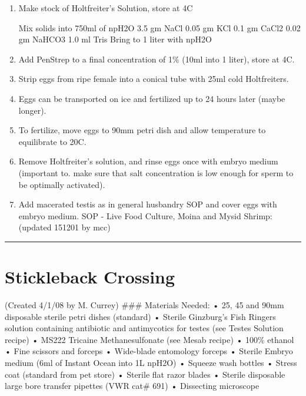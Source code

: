 \documentclass[
]{book}
\begin{document}
\begin{enumerate}
\def\labelenumi{\arabic{enumi}.}
\item
  Make stock of Holtfreiter's Solution, store at 4C

  Mix solids into 750ml of npH2O
  3.5 gm NaCl
  0.05 gm KCl
  0.1 gm CaCl2
  0.02 gm NaHCO3
  1.0 ml Tris
  Bring to 1 liter with npH2O
\item
  Add PenStrep to a final concentration of 1\% (10ml into 1 liter), store at 4C.
\item
  Strip eggs from ripe female into a conical tube with 25ml cold Holtfreiters.
\item
  Eggs can be transported on ice and fertilized up to 24 hours later (maybe longer).
\item
  To fertilize, move eggs to 90mm petri dish and allow temperature to equilibrate to 20C.
\item
  Remove Holtfreiter's solution, and rinse eggs once with embryo medium (important to.
  make sure that salt concentration is low enough for sperm to be optimally activated).
\item
  Add macerated testis as in general husbandry SOP and cover eggs with embryo medium.
  SOP - Live Food Culture, Moina and Mysid Shrimp:
  (updated 151201 by mcc)
\end{enumerate}

\begin{center}\rule{0.5\linewidth}{0.5pt}\end{center}

\hypertarget{stickleback-crossing}{%
\section{Stickleback Crossing}\label{stickleback-crossing}}

(Created 4/1/08 by M. Currey)
\#\#\# Materials Needed:
• 25, 45 and 90mm disposable sterile petri dishes (standard)
• Sterile Ginzburg's Fish Ringers solution containing antibiotic and antimycotics for testes (see Testes Solution recipe)
• MS222 Tricaine Methanesulfonate (see Mesab recipe)
• 100\% ethanol
• Fine scissors and forceps
• Wide-blade entomology forceps
• Sterile Embryo medium (6ml of Instant Ocean into 1L npH2O)
• Squeeze wash bottles
• Stress coat (standard from pet store)
• Sterile flat razor blades
• Sterile disposable large bore transfer pipettes (VWR cat\# 691)
• Dissecting microscope
\end{document}
